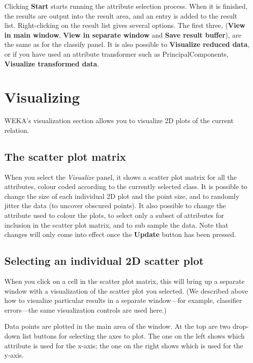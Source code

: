 \documentclass[a4paper]{article}
\begin{document}
Clicking \textbf{Start} starts running the attribute selection
process.  When it is finished, the results are output into the result
area, and an entry is added to the result list.  Right-clicking on the
result list gives several options. The first three, (\textbf{View in
main window}, \textbf{View in separate window} and \textbf{Save result
buffer}), are the same as for the classify panel.  It is also possible
to \textbf{Visualize reduced data}, or if you have used an attribute
transformer such as PrincipalComponents, \textbf{Visualize transformed
data}.

\section{Visualizing}

WEKA's visualization section allows you to visualize 2D plots of the
current relation.  

\subsection{The scatter plot matrix}

When you select the {\em Visualize} panel, it shows a scatter plot
matrix for all the attributes, colour coded according to the currently
selected class. It is possible to change the size of each individual
2D plot and the point size, and to randomly jitter the data (to
uncover obscured points). It also possible to change the attribute
used to colour the plots, to select only a subset of attributes for
inclusion in the scatter plot matrix, and to sub sample the data. Note
that changes will only come into effect once the \textbf{Update}
button has been pressed.

\subsection{Selecting an individual 2D scatter plot}
 
When you click on a cell in the scatter plot matrix, this will bring
up a separate window with a visualization of the scatter plot you
selected.  (We described above how to visualize particular results in
a separate window---for example, classifier errors---the same
visualization controls are used here.)

Data points are plotted in the main area of the window.  At the top
are two drop-down list buttons for selecting the axes to plot.  The
one on the left shows which attribute is used for the x-axis; the one
on the right shows which is used for the y-axis.
\end{document}
